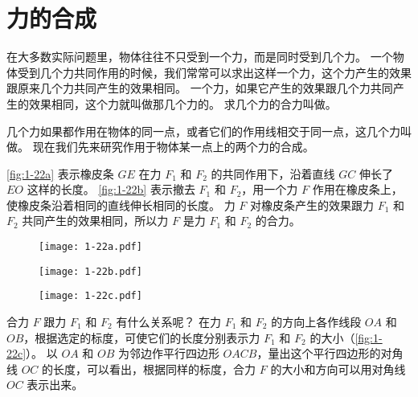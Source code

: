 \section{力的合成}

在大多数实际问题里，物体往往不只受到一个力，而是同时受到几个力。
一个物体受到几个力共同作用的时候，我们常常可以求出这样一个力，这个力产生的效果跟原来几个力共同产生的效果相同。
一个力，如果它产生的效果跟几个力共同产生的效果相同，这个力就叫做那几个力的。
求几个力的合力叫做。 

几个力如果都作用在物体的同一点，或者它们的作用线相交于同一点，这几个力叫做。
现在我们先来研究作用于物体某一点上的两个力的合成。

\cref{fig:1-22a} 表示橡皮条 $GE$ 在力 $F_1$ 和 $F_2$ 的共同作用下，沿着直线 $GC$ 伸长了 $EO$ 这样的长度。
\cref{fig:1-22b} 表示撤去 $F_1$ 和 $F_2$，用一个力 $F$ 作用在橡皮条上，使橡皮条沿着相同的直线伸长相同的长度。
力 $F$ 对橡皮条产生的效果跟力 $F_1$ 和 $F_2$ 共同产生的效果相同，所以力 $F$ 是力 $F_1$ 和 $F_2$ 的合力。

\begin{figure}
  \begin{minipage}{0.25\linewidth}\raggedleft
    \subcaption{}\label{fig:1-22a}
  \end{minipage}%
  \begin{minipage}{0.75\linewidth}
    \texttt{[image: 1-22a.pdf]}
  \end{minipage}
  \begin{minipage}{0.25\linewidth}\raggedleft
    \subcaption{}\label{fig:1-22b}
  \end{minipage}%
  \begin{minipage}{0.75\linewidth}
    \texttt{[image: 1-22b.pdf]}
  \end{minipage}
  \begin{minipage}{0.25\linewidth}\raggedleft
    \subcaption{}\label{fig:1-22c}
  \end{minipage}%
  \begin{minipage}{0.75\linewidth}
    \texttt{[image: 1-22c.pdf]}
  \end{minipage}
  \caption{}\label{fig:1-22}
\end{figure}

合力 $F$ 跟力 $F_1$ 和 $F_2$ 有什么关系呢？
在力 $F_1$ 和 $F_2$ 的方向上各作线段 $OA$ 和 $OB$，根据选定的标度，可使它们的长度分别表示力 $F_1$ 和 $F_2$ 的大小（\cref{fig:1-22c}）。
以 $OA$ 和 $OB$ 为邻边作平行四边形 $OACB$，量出这个平行四边形的对角线 $OC$ 的长度，可以看出，根据同样的标度，合力 $F$ 的大小和方向可以用对角线 $OC$ 表示出来。

